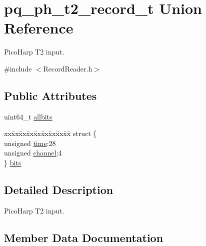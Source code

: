 \hypertarget{unionpq__ph__t2__record__t}{}\section{pq\+\_\+ph\+\_\+t2\+\_\+record\+\_\+t Union Reference}
\label{unionpq__ph__t2__record__t}


Pico\+Harp T2 input.  




{\ttfamily \#include $<$Record\+Reader.\+h$>$}

\subsection*{Public Attributes}
\begin{DoxyCompactItemize}
\item 
uint64\+\_\+t \hyperlink{unionpq__ph__t2__record__t_a22557bcd3dc90f890c1a536583ee6bc5}{allbits}
\item 
\begin{tabbing}
xx\=xx\=xx\=xx\=xx\=xx\=xx\=xx\=xx\=\kill
struct \{\\
\>unsigned \hyperlink{unionpq__ph__t2__record__t_adeb309eac7896961fbca98e6a7aba4a1}{time}:28\\
\>unsigned \hyperlink{unionpq__ph__t2__record__t_a3104847e38149b1f437c8cf354b4dbf0}{channel}:4\\
\} \hyperlink{unionpq__ph__t2__record__t_a425a1a3e8c54c9032ee8e8b256a177bd}{bits}\\

\end{tabbing}\end{DoxyCompactItemize}


\subsection{Detailed Description}
Pico\+Harp T2 input. 

\subsection{Member Data Documentation}
\mbox{\label{unionpq__ph__t2__record__t_a22557bcd3dc90f890c1a536583ee6bc5}} 
